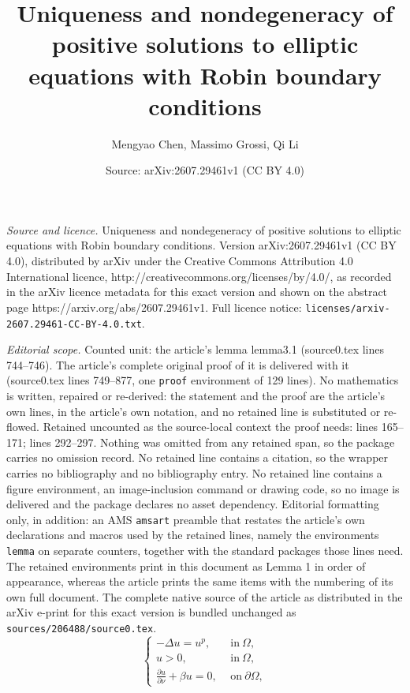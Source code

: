 \documentclass[10pt,a4paper]{amsart}
\title{Uniqueness and nondegeneracy of positive solutions to elliptic equations with Robin boundary conditions}
\author{Mengyao Chen, Massimo Grossi, Qi Li}
\date{Source: arXiv:2607.29461v1 (CC BY 4.0)}
\begin{document}
\maketitle

\noindent\emph{Source and licence.} Uniqueness and nondegeneracy of positive solutions to elliptic equations with Robin boundary conditions. Version arXiv:2607.29461v1 (CC BY 4.0), distributed by arXiv under the Creative Commons Attribution 4.0 International licence, http://creativecommons.org/licenses/by/4.0/, as recorded in the arXiv licence metadata for this exact version and shown on the abstract page https://arxiv.org/abs/2607.29461v1. Full licence notice: \texttt{licenses/arxiv-2607.29461-CC-BY-4.0.txt}.\par\smallskip

\noindent\textit{Editorial scope.} Counted unit: the article's lemma lemma3.1 (source0.tex lines 744--746). The article's complete original proof of it is delivered with it (source0.tex lines 749--877, one \texttt{proof} environment of 129 lines). No mathematics is written, repaired or re-derived: the statement and the proof are the article's own lines, in the article's own notation, and no retained line is substituted or re-flowed.  Retained uncounted as the source-local context the proof needs: lines 165--171; lines 292--297.  Nothing was omitted from any retained span, so the package carries no omission record.  No retained line contains a citation, so the wrapper carries no bibliography and no bibliography entry.  No retained line contains a figure environment, an image-inclusion command or drawing code, so no image is delivered and the package declares no asset dependency.  Editorial formatting only, in addition: an AMS \texttt{amsart} preamble that restates the article's own declarations and macros used by the retained lines, namely the environments \texttt{lemma} on separate counters, together with the standard packages those lines need.  The retained environments print in this document as Lemma 1 in order of appearance, whereas the article prints the same items with the numbering of its own full document.  The complete native source of the article as distributed in the arXiv e-print for this exact version is bundled unchanged as \texttt{sources/206488/source0.tex}.
\begin{equation}\label{eq0.1}
\begin{cases}
-\Delta u=u^p,\quad &\text{in}\ \Omega,\\
u>0, &\text{in}\ \Omega,\\
\frac{\partial u}{\partial \nu}+\beta u=0, &\text{on}\ \partial \Omega,
\end{cases}
\end{equation}
\end{document}
